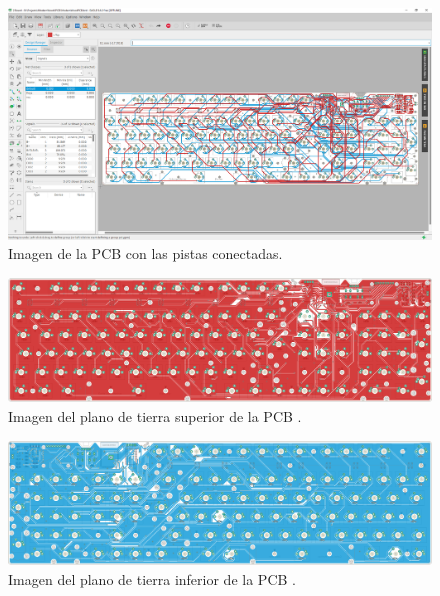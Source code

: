 \begin{figure}[H]
    \centering
    \includegraphics[width=1\textwidth]{imagenes/Capitulos/Cap05/EaglePCBConectada.png}
    \caption{Imagen de la \gls{PCB} con las pistas conectadas.}
    \label{fig:EaglePCBConectada}
\end{figure}

\begin{figure}[H]
    \centering
    \includegraphics[width=1\textwidth]{imagenes/Capitulos/Cap05/EaglePCBPlanoTierra1.png}
    \caption{Imagen del plano de tierra superior de la \gls{PCB} \cite{Repo:ImagenPCB}.}
    \label{fig:EaglePCBPlanoTierra1}
\end{figure}

\begin{figure}[H]
    \centering
    \includegraphics[width=1\textwidth]{imagenes/Capitulos/Cap05/EaglePCBPlanoTierra2.png}
    \caption{Imagen del plano de tierra inferior de la \gls{PCB} \cite{Repo:ImagenPCB}.}
    \label{fig:EaglePCBPlanoTierra2}
\end{figure}

